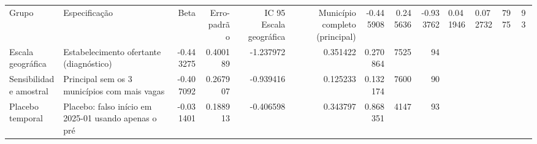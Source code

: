 \begin{tabular}{llrrrrrrr}
\toprule
Grupo & Especificação & Beta & Erro-padrão & IC 95%
\midrule
Escala geográfica & Município completo (principal) & -0.445908 & 0.245636 & -0.933762 & 0.041946 & 0.072732 & 7975 & 93 \\
Escala geográfica & Estabelecimento ofertante (diagnóstico) & -0.443275 & 0.400189 & -1.237972 & 0.351422 & 0.270864 & 7525 & 94 \\
Sensibilidade amostral & Principal sem os 3 municípios com mais vagas & -0.407092 & 0.267907 & -0.939416 & 0.125233 & 0.132174 & 7600 & 90 \\
Placebo temporal & Placebo: falso início em 2025-01 usando apenas o pré & -0.031401 & 0.188913 & -0.406598 & 0.343797 & 0.868351 & 4147 & 93 \\
\bottomrule
\end{tabular}

